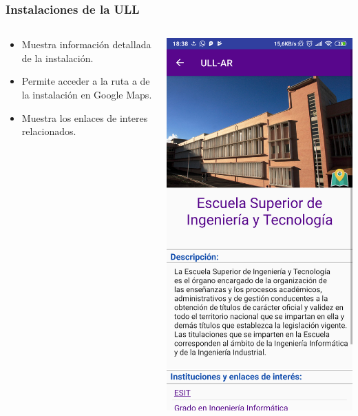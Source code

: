 \begin{frame}
	\frametitle{Instalaciones de la ULL}
	\begin{columns}
		\begin{column}{0.6\textwidth}
			\begin{itemize}
				\item Muestra información detallada de la instalación.
				\item Permite acceder a la ruta a de la instalación en Google Maps.
				\item Muestra los enlaces de interes relacionados.
			\end{itemize}
			\endblock{}
		\end{column}
		\begin{column}{0.4\textwidth} 
			\vfill 
			\begin{center}
				\includegraphics[width=0.75\linewidth]{Images/siteInfoApp}
			\end{center}
		\end{column}
	\end{columns}
\end{frame} 
  
